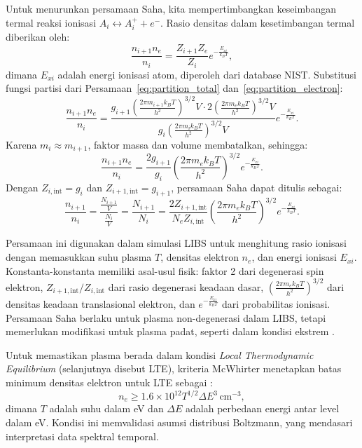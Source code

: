 Untuk menurunkan persamaan Saha, kita mempertimbangkan keseimbangan termal reaksi ionisasi \( A_i \leftrightarrow A_i^+ + e^- \). Rasio densitas dalam kesetimbangan termal diberikan oleh:
\begin{equation}
\frac{n_{i+1} n_e}{n_i} = \frac{Z_{i+1} Z_e}{Z_i} e^{-\frac{E_{xi}}{k_B T}}, \label{eq:saha_initial}
\end{equation}
dimana \( E_{xi} \) adalah energi ionisasi atom, diperoleh dari database NIST. Substitusi fungsi partisi dari Persamaan~\eqref{eq:partition_total} dan~\eqref{eq:partition_electron}:
\begin{equation}
\frac{n_{i+1} n_e}{n_i} = \frac{g_{i+1} \left( \frac{2\pi m_{i+1} k_B T}{h^2} \right)^{3/2} V \cdot 2 \left( \frac{2\pi m_e k_B T}{h^2} \right)^{3/2} V}{g_i \left( \frac{2\pi m_i k_B T}{h^2} \right)^{3/2} V} e^{-\frac{E_{xi}}{k_B T}}. \label{eq:saha_substitution}
\end{equation}
Karena \( m_i \approx m_{i+1} \), faktor massa dan volume membatalkan, sehingga:
\begin{equation}
\frac{n_{i+1} n_e}{n_i} = \frac{2 g_{i+1}}{g_i} \left( \frac{2\pi m_e k_B T}{h^2} \right)^{3/2} e^{-\frac{E_{xi}}{k_B T}}. \label{eq:saha_final}
\end{equation}
Dengan \( Z_{i,\text{int}} = g_i \) dan \( Z_{i+1,\text{int}} = g_{i+1} \), persamaan Saha dapat ditulis sebagai:
\begin{equation}
\frac{n_{i+1}}{n_i} = \frac{\frac{N_{i+1}}{V}} {\frac{N_{i}}{V}}= \frac{N_{i+1}} {N_{i}} = \frac{2Z_{i+1,\text{int}}}{N_eZ_{i,\text{int}}} \left( \frac{2\pi m_e k_B T}{h^2} \right)^{3/2} e^{-\frac{E_{xi}}{k_B T}}. \label{eq:saha_final_int}
\end{equation}

Persamaan ini digunakan dalam simulasi LIBS untuk menghitung rasio ionisasi dengan memasukkan suhu plasma \( T \), densitas elektron \( n_e \), dan energi ionisasi \( E_{xi} \). Konstanta-konstanta memiliki asal-usul fisik: faktor 2 dari degenerasi spin elektron, \( Z_{i+1,\text{int}}/Z_{i,\text{int}} \) dari rasio degenerasi keadaan dasar, \( \left( \frac{2\pi m_e k_B T}{h^2} \right)^{3/2} \) dari densitas keadaan translasional elektron, dan \( e^{-\frac{E_{xi}}{k_B T}} \) dari probabilitas ionisasi. Persamaan Saha berlaku untuk plasma non-degenerasi dalam LIBS, tetapi memerlukan modifikasi untuk plasma padat, seperti dalam kondisi ekstrem \citep{Chandrasekhar1939}.

Untuk memastikan plasma berada dalam kondisi \textit{Local Thermodynamic Equilibrium} (selanjutnya disebut LTE), kriteria McWhirter menetapkan batas minimum densitas elektron untuk LTE sebagai \citep{McWhirter1965}:
\begin{equation}
n_e \geq 1.6 \times 10^{12} T^{1/2} \Delta E^3 \, \text{cm}^{-3}, \label{eq:mcwhirter}
\end{equation}
dimana \( T \) adalah suhu dalam eV dan \( \Delta E \) adalah perbedaan energi antar level dalam eV. Kondisi ini memvalidasi asumsi distribusi Boltzmann, yang mendasari interpretasi data spektral temporal.

